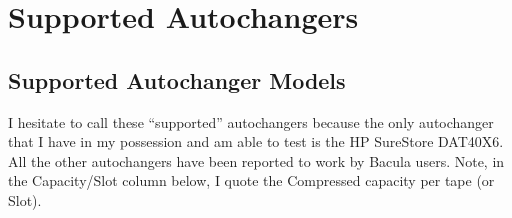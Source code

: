 
\section*{Supported Autochangers}
\label{_ChapterStart21}

\subsection*{Supported Autochanger Models}
\label{Models}

I hesitate to call these ``supported'' autochangers because the only
autochanger that I have in my possession and am able to test is the HP
SureStore DAT40X6. All the other autochangers have been reported to work by
Bacula users. Note, in the Capacity/Slot column below, I quote the Compressed
capacity per tape (or Slot). 


